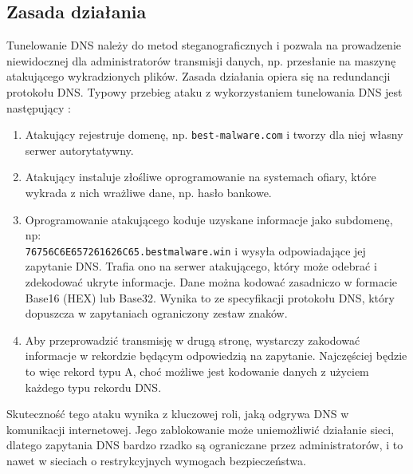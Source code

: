 \documentclass{eiti-raport}
\begin{document}
\subsection{Zasada działania} \label{sec:tunelowanie}
Tunelowanie DNS należy do metod steganograficznych i pozwala na prowadzenie niewidocznej dla administratorów transmisji danych, np. przesłanie na maszynę atakującego wykradzionych plików. Zasada działania opiera się na redundancji protokołu DNS. Typowy przebieg ataku z wykorzystaniem tunelowania DNS jest następujący \cite{infosec}:
\begin{enumerate}
	\item Atakujący rejestruje domenę, np. \texttt{best-malware.com} i tworzy dla niej własny serwer autorytatywny. 
	\item Atakujący instaluje złośliwe oprogramowanie na systemach ofiary, które wykrada z nich wrażliwe dane, np. hasło bankowe. 
	\item Oprogramowanie atakującego koduje uzyskane informacje jako subdomenę, np: \\  \texttt{76756C6E657261626C65.bestmalware.win} i wysyła odpowiadające jej zapytanie DNS. Trafia ono na serwer atakującego, który może odebrać i zdekodować ukryte informacje. Dane można kodować zasadniczo w formacie Base16 (HEX) lub Base32. Wynika to ze specyfikacji protokołu DNS, który dopuszcza w zapytaniach ograniczony zestaw znaków. 
	\item Aby przeprowadzić transmisję w drugą stronę, wystarczy zakodować informacje w rekordzie będącym odpowiedzią na zapytanie. Najczęściej będzie to więc rekord typu A, choć możliwe jest kodowanie danych z użyciem każdego typu rekordu DNS. 
\end{enumerate}
Skuteczność tego ataku wynika z kluczowej roli, jaką odgrywa DNS w komunikacji internetowej. Jego zablokowanie może uniemożliwić działanie sieci, dlatego zapytania DNS bardzo rzadko są ograniczane przez administratorów, i to nawet w sieciach o restrykcyjnych wymogach bezpieczeństwa. 
\end{document}
